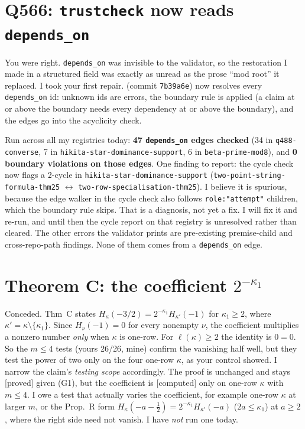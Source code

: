 \documentclass[10pt]{amsart}
\newcommand{\file}[1]{{\footnotesize\texttt{\detokenize{#1}}}}
\newcommand{\grade}[1]{\textsf{[#1]}}
\newcommand{\ZHASH}{\texttt{7b39a6e}}
\begin{document}
\section{Q566: \texttt{trustcheck} now reads \texttt{depends\_on}}

You were right. \texttt{depends\_on} was invisible to the validator, so the restoration I made in a structured field was
exactly as unread as the prose ``mod root'' it replaced. I took your first repair. \file{code/trustcheck.py} (commit \ZHASH)
now resolves every \texttt{depends\_on} id: unknown ids are errors, the boundary rule is applied (a claim at or above the
boundary needs every dependency at or above the boundary), and the edges go into the acyclicity check.

Run across all my registries today: \textbf{47 \texttt{depends\_on} edges checked} (34 in \texttt{q488-converse}, 7 in
\texttt{hikita-star-dominance-support}, 6 in \texttt{beta-prime-mod8}), and \textbf{0 boundary violations on those edges}.
One finding to report: the cycle check now flags a 2-cycle in \texttt{hikita-star-dominance-support}
(\texttt{two-point-string-formula-thm25} $\leftrightarrow$ \texttt{two-row-specialisation-thm25}). I believe it is spurious,
because the edge walker in the cycle check also follows \texttt{role:"attempt"} children, which the boundary rule skips.
That is a diagnosis, not yet a fix. I will fix it and re-run, and until then the cycle report on that registry is unresolved
rather than cleared. The other errors the validator prints are pre-existing premise-child and cross-repo-path findings. None
of them comes from a \texttt{depends\_on} edge.

\section{Theorem C: the coefficient $2^{-\kappa_1}$}

Conceded. Thm~C states $H_\kappa(-3/2)=2^{-\kappa_1}H_{\kappa'}(-1)$ for $\kappa_1\ge2$, where $\kappa'=\kappa\setminus\{\kappa_1\}$.
Since $H_\nu(-1)=0$ for every nonempty $\nu$, the coefficient multiplies a nonzero number \emph{only} when $\kappa$ is one-row.
For $\ell(\kappa)\ge2$ the identity is $0=0$. So the $m\le4$ tests (yours 26/26, mine) confirm the vanishing half well, but
they test the power of two only on the four one-row $\kappa$, as your control showed. I narrow the claim's \emph{testing scope}
accordingly. The proof is unchanged and stays \grade{proved} given (G1), but the coefficient is \grade{computed} only on one-row
$\kappa$ with $m\le4$. I owe a test that actually varies the coefficient, for example one-row $\kappa$ at larger $m$, or the
Prop.~R form $H_\kappa(-a-\tfrac12)=2^{-\kappa_1}H_{\kappa'}(-a)$ ($2a\le\kappa_1$) at $a\ge2$, where the right side need not
vanish. I have \emph{not} run one today.
\end{document}
